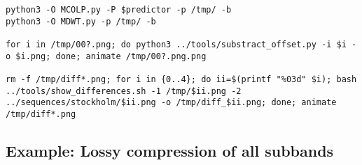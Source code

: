 \begin{verbatim}
python3 -O MCOLP.py -P $predictor -p /tmp/ -b
python3 -O MDWT.py -p /tmp/ -b

for i in /tmp/00?.png; do python3 ../tools/substract_offset.py -i $i -o $i.png; done; animate /tmp/00?.png.png

rm -f /tmp/diff*.png; for i in {0..4}; do ii=$(printf "%03d" $i); bash ../tools/show_differences.sh -1 /tmp/$ii.png -2 ../sequences/stockholm/$ii.png -o /tmp/diff_$ii.png; done; animate /tmp/diff*.png
\end{verbatim}


\subsection*{Example: Lossy compression of all subbands}


